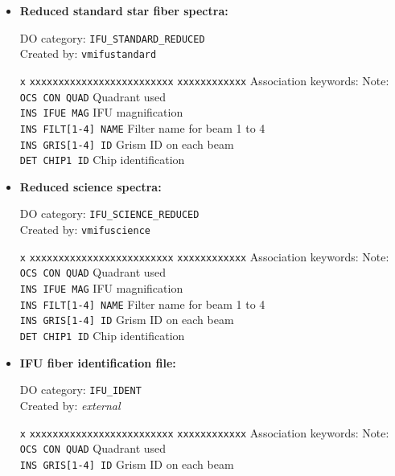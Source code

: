 \begin{itemize}
\item {\bf Reduced standard star fiber spectra:}

DO category: {\tt IFU\_STANDARD\_REDUCED} \\
Created by: {\tt vmifustandard} \\

\begin{tabbing}
{\tt x} \= {\tt xxxxxxxxxxxxxxxxxxxxxxxxx} \= {\tt xxxxxxxxxxxx} \kill
\> Association keywords: \> Note: \\
\> {\tt OCS CON QUAD} \> Quadrant used \\
\> {\tt INS IFUE MAG} \> IFU magnification \\
\> {\tt INS FILT[1-4] NAME} \> Filter name for beam 1 to 4 \\
\> {\tt INS GRIS[1-4] ID} \> Grism ID on each beam \\
\> {\tt DET CHIP1 ID} \> Chip identification \\
\end{tabbing}

\item {\bf Reduced science spectra:}

DO category: {\tt IFU\_SCIENCE\_REDUCED} \\
Created by: {\tt vmifuscience} \\

\begin{tabbing}
{\tt x} \= {\tt xxxxxxxxxxxxxxxxxxxxxxxxx} \= {\tt xxxxxxxxxxxx} \kill
\> Association keywords: \> Note: \\
\> {\tt OCS CON QUAD} \> Quadrant used \\
\> {\tt INS IFUE MAG} \> IFU magnification \\
\> {\tt INS FILT[1-4] NAME} \> Filter name for beam 1 to 4 \\
\> {\tt INS GRIS[1-4] ID} \> Grism ID on each beam \\
\> {\tt DET CHIP1 ID} \> Chip identification \\
\end{tabbing}

\item {\bf IFU fiber identification file:}

DO category: {\tt IFU\_IDENT} \\
Created by: {\it external} \\

\begin{tabbing}
{\tt x} \= {\tt xxxxxxxxxxxxxxxxxxxxxxxxx} \= {\tt xxxxxxxxxxxx} \kill
\> Association keywords: \> Note: \\
\> {\tt OCS CON QUAD} \> Quadrant used \\
\> {\tt INS GRIS[1-4] ID} \> Grism ID on each beam \\
\end{tabbing}


\end{itemize}

